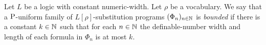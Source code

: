\documentclass[../main/thesis.tex]{subfiles}
\begin{document}
Let $L$ be a logic with constant numeric-width. Let $\rho$ be a vocabulary. We
say that a $\mathrm{P}$-uniform family of $L[\rho]$-substitution programs $(\Phi_n)_{n
  \in \mathbb{N}}$ is \emph{bounded} if there is a constant $k \in \mathbb{N}$ such that
for each $n \in \mathbb{N}$ the definable-number width and length of each formula in
$\Phi_n$ is at most $k$.
\end{document}
